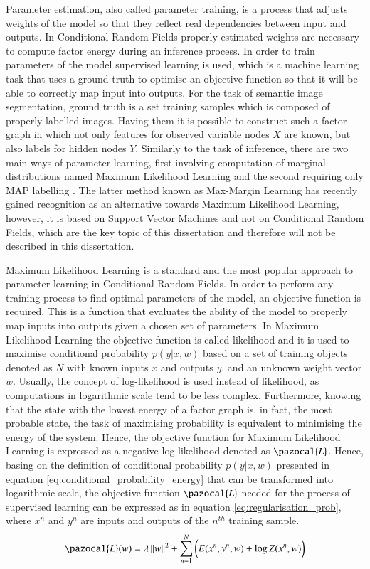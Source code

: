 Parameter estimation, also called parameter training, is a process that adjusts weights of the model so that they reflect real dependencies between input and outputs. In Conditional Random Fields properly estimated weights are necessary to compute factor energy during an inference process. In order to train parameters of the model supervised learning is used, which is a machine learning task that uses a ground truth to optimise an objective function so that it will be able to correctly map input into outputs. For the task of semantic image segmentation, ground truth is a set training samples which is composed of properly labelled images. Having them it is possible to construct such a factor graph in which not only features for observed variable nodes $X$ are known, but also labels for hidden nodes $Y$. Similarly to the task of inference, there are two main ways of parameter learning, first involving computation of marginal distributions named Maximum Likelihood Learning and the second requiring only MAP labelling \cite{markov_blake}. The latter method known as Max-Margin Learning has recently gained recognition as an alternative towards Maximum Likelihood Learning, however, it is based on Support Vector Machines and not on Conditional Random Fields, which are the key topic of this dissertation and therefore will not be described in this dissertation. 

\newpage
Maximum Likelihood Learning is a standard and the most popular approach to parameter learning in Conditional Random Fields. In order to perform any training process to find optimal parameters of the model, an objective function is required. This is a function that evaluates the ability of the model to properly map inputs into outputs given a chosen set of parameters. In Maximum Likelihood Learning the objective function is called likelihood and it is used to maximise conditional probability $p(y|x,w)$ based on a set of training objects denoted as $N$ with known inputs $x$ and outputs $y$, and an unknown weight vector $w$. Usually, the concept of log-likelihood is used instead of likelihood, as computations in logarithmic scale tend to be less complex. Furthermore, knowing that the state with the lowest energy of a factor graph is, in fact, the most probable state, the task of maximising probability is equivalent to minimising the energy of the system. Hence, the objective function for Maximum Likelihood Learning is expressed as a negative log-likelihood denoted as $\pazocal{L}$. Hence, basing on the definition of conditional probability $p(y|x,w)$ presented in equation \ref{eq:conditional_probability_energy} that can be transformed into logarithmic scale, the objective function $\pazocal{L}$ needed for the process of supervised learning can be expressed as in equation \ref{eq:regularisation_prob}, where $x^n$ and $y^n$ are inputs and outputs of the $n^{th}$ training sample.
\begin{equation}
     \label{eq:regularisation_prob}
    \pazocal{L}(w) = \lambda \left \| w \right \|^2 + \sum_{n=1}^{N}\bigg({E(x^n,y^n,w)} + {\log{Z}(x^n,w)}\bigg)
\end{equation}

